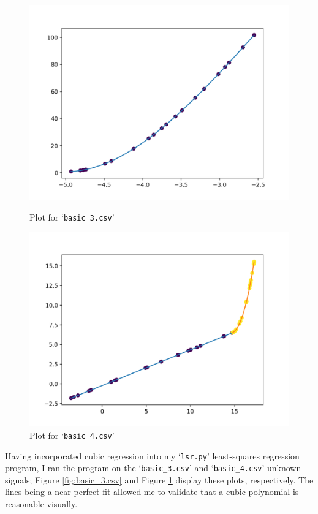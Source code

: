 \documentclass[onecolumn, 12pt, a4paper]{article}
\begin{document}
\begin{figure}[htbp]
\centering
\begin{minipage}[b]{.49\textwidth}
    \includegraphics[width=\textwidth]{images/basic_3.png}
    \caption{Plot for `\texttt{basic\_3.csv}'}
    \label{fig:basic_3.csv}
\end{minipage}
\hfill
\begin{minipage}[b]{.49\textwidth}
    \includegraphics[width=\textwidth]{images/basic_4.png}
    \caption{Plot for `\texttt{basic\_4.csv}'}
    \label{fig:basic_4.csv}
\end{minipage}
\end{figure}

Having incorporated cubic regression into my `\texttt{lsr.py}'
least-squares regression program, I ran the program on
the `\texttt{basic\_3.csv}' and `\texttt{basic\_4.csv}'
unknown signals;
Figure \ref{fig:basic_3.csv} and Figure \ref{fig:basic_4.csv}
display these plots, respectively.
The lines being a near-perfect fit allowed me to validate
that a cubic polynomial is reasonable visually.
\end{document}

